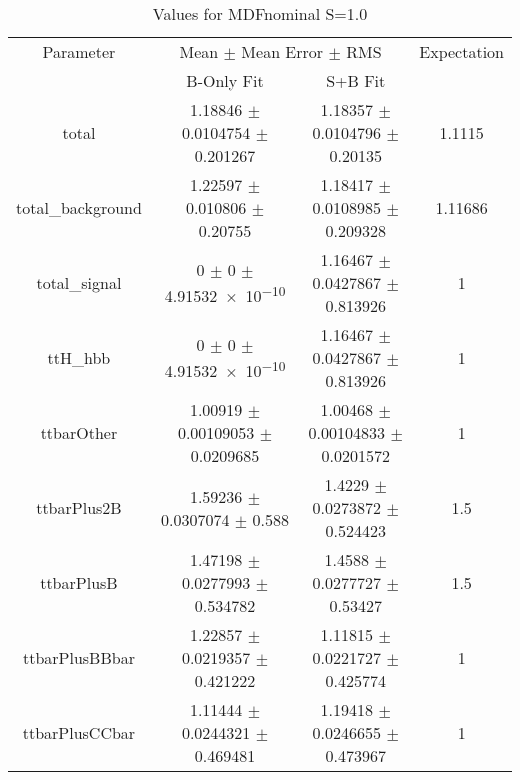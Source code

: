 \begin{table}
\centering
\caption{Values for MDFnominal S=1.0}
\begin{tabular}{cccc}
\toprule
Parameter & \multicolumn{2}{c}{Mean $\pm$ Mean Error $\pm$ RMS} & Expectation\\
 & B-Only Fit & S+B Fit & \\
\midrule
total & \num{1.18846} $\pm$ \num{0.0104754} $\pm$ \num{0.201267} & \num{1.18357} $\pm$ \num{0.0104796} $\pm$ \num{0.20135} & \num{1.1115}\\
total\_background & \num{1.22597} $\pm$ \num{0.010806} $\pm$ \num{0.20755} & \num{1.18417} $\pm$ \num{0.0108985} $\pm$ \num{0.209328} & \num{1.11686}\\
total\_signal & \num{0} $\pm$ \num{0} $\pm$ \num{4.91532e-10} & \num{1.16467} $\pm$ \num{0.0427867} $\pm$ \num{0.813926} & \num{1}\\
ttH\_hbb & \num{0} $\pm$ \num{0} $\pm$ \num{4.91532e-10} & \num{1.16467} $\pm$ \num{0.0427867} $\pm$ \num{0.813926} & \num{1}\\
ttbarOther & \num{1.00919} $\pm$ \num{0.00109053} $\pm$ \num{0.0209685} & \num{1.00468} $\pm$ \num{0.00104833} $\pm$ \num{0.0201572} & \num{1}\\
ttbarPlus2B & \num{1.59236} $\pm$ \num{0.0307074} $\pm$ \num{0.588} & \num{1.4229} $\pm$ \num{0.0273872} $\pm$ \num{0.524423} & \num{1.5}\\
ttbarPlusB & \num{1.47198} $\pm$ \num{0.0277993} $\pm$ \num{0.534782} & \num{1.4588} $\pm$ \num{0.0277727} $\pm$ \num{0.53427} & \num{1.5}\\
ttbarPlusBBbar & \num{1.22857} $\pm$ \num{0.0219357} $\pm$ \num{0.421222} & \num{1.11815} $\pm$ \num{0.0221727} $\pm$ \num{0.425774} & \num{1}\\
ttbarPlusCCbar & \num{1.11444} $\pm$ \num{0.0244321} $\pm$ \num{0.469481} & \num{1.19418} $\pm$ \num{0.0246655} $\pm$ \num{0.473967} & \num{1}\\
\bottomrule
\end{tabular}
\end{table}